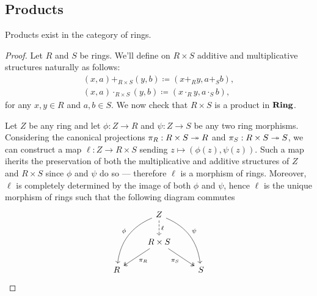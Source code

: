 \subsection{Products}

%
\begin{proposition}[Product]
\label{prop:product-ring}
Products exist in the category of rings.
\end{proposition}
%

%
\begin{proof}
Let \(R\) and \(S\) be rings. We'll define on \(R \times S\) additive and
multiplicative structures naturally as follows:
\begin{gather*}
(x, a) +_{R \times S} (y, b)     \coloneq (x +_R y, a +_S b), \\
(x, a) \cdot_{R \times S} (y, b) \coloneq (x \cdot_R y, a \cdot_S b),
\end{gather*}
for any \(x, y \in R\) and \(a, b \in S\). We now check that \(R \times S\) is a
product in \({\textbf{Ring}}\).

Let \(Z\) be any ring and let \(\phi: Z \to R\) and \(\psi: Z \to S\) be any two
ring morphisms. Considering the canonical projections \(\pi_R: R \times S \twoheadrightarrow
R\) and \(\pi_S: R \times S \twoheadrightarrow S\), we can construct a map \(\ell: Z \to R
\times S\) sending \(z \mapsto (\phi(z), \psi(z))\). Such a map iherits the
preservation of both the multiplicative and additive structures of \(Z\) and \(R
\times S\) since \(\phi\) and \(\psi\) do so --- therefore \(\ell\) is a
morphism of rings. Moreover, \(\ell\) is completely determined by the image of
both \(\phi\) and \(\psi\), hence \(\ell\) is the unique morphism of rings such
that the following diagram commutes
\[
\begin{tikzcd}
&Z \ar[ddl, bend right, swap, "\phi"]
\ar[ddr, bend left, "\psi"]
\ar[d, dashed, "\ell"] & \\
&R \times S \ar[ld, two heads, "\pi_R"]
\ar[rd, two heads, swap, "\pi_S"] &\\
R & &S
\end{tikzcd}
\]
\end{proof}
%

